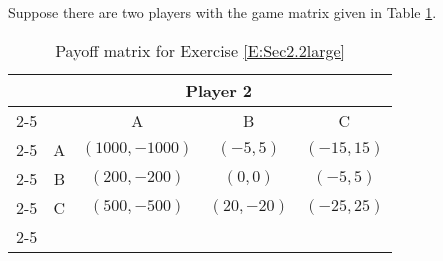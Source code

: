 \begin{xca}\label{E:Sec2.2large}  Suppose there are two players with the game matrix given in Table \ref{T:matrixEx2Sec2.2}.




\begin{table}[h]
\centering

\begin{tabular}{ccccc}
                      & \multicolumn{4}{c}{Player 2}                                                  \\ \cline{2-5} 
\multicolumn{1}{l|}{} & \multicolumn{1}{l|}{} & \multicolumn{1}{c|}{A} & \multicolumn{1}{c|}{B} & \multicolumn{1}{c|}{C}\\ \cline{2-5} 
\multicolumn{1}{l|}{Player 1} & \multicolumn{1}{c|}{A} & \multicolumn{1}{c|}{$(1000, -1000)$} & \multicolumn{1}{c|}{$(-5, 5)$} & \multicolumn{1}{c|}{$(-15,15)$}\\ \cline{2-5} 
\multicolumn{1}{l|}{} & \multicolumn{1}{c|}{B} & \multicolumn{1}{c|}{$(200, -200)$} & \multicolumn{1}{c|}{$(0, 0)$} & \multicolumn{1}{c|}{$(-5,5)$}\\ \cline{2-5} 
\multicolumn{1}{l|}{} & \multicolumn{1}{c|}{C} & \multicolumn{1}{c|}{$(500, -500)$} & \multicolumn{1}{c|}{$(20, -20)$} & \multicolumn{1}{c|}{$(-25,25)$} \\ \cline{2-5} 
\end{tabular}
\caption{Payoff matrix for Exercise \ref{E:Sec2.2large}}
\label{T:matrixEx2Sec2.2}
\end{table}




\end{xca}
